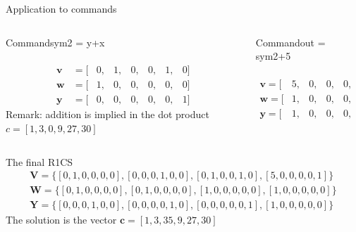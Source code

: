 \documentclass[handout]{beamer}
\begin{document}
\begin{frame}{Application to commands}   
    \begin{columns}[T] %
    \begin{column}{.48\textwidth}
    \begin{block}{Command}sym2 = y+x\end{block}
    
    \begin{align*}       
         [ &one,&x,&out,&sym_1,&y,&sym_2 ]\\ 
         \bm{v} &= [&0,&1,&0,&0,&1,&0]  \\ 
         \bm{w} &= [&1,&0,&0,&0,&0,&0]  \\
         \bm{y} &= [&0,&0,&0,&0,&0,&1] 
    \end{align*}    \pause
    Remark: addition is implied in the dot product
    $c = [1,3,0,9,27,30]$
    \end{column}%
    \hfill%
    \begin{column}{.48\textwidth}
    \begin{block}{Command}out = sym2+5\end{block}
    
    \begin{align*}     
         [ &one,&x,&out,&sym_1,&y,&sym_2 ]\\    
         \bm{v} = [&5,&0,&0,&0,&0,&1]  \\
         \bm{w} = [&1,&0,&0,&0,&0,&0]  \\
         \bm{y} = [&1,&0,&0,&0,&0,&0] 
    \end{align*}    
    \end{column}%
\end{columns} 
\end{frame}

\begin{frame}{The final R1CS}
    \begin{align*}        
         \bm{V} = \{[0,1,0,0,0,0], [0,0,0,1,0,0],[0,1,0,0,1,0],[5,0,0,0,0,1]  \}\\
         \bm{W} = \{[0,1,0,0,0,0],[0,1,0,0,0,0],[1,0,0,0,0,0] ,[1,0,0,0,0,0]  \}\\
         \bm{Y} = \{[0,0,0,1,0,0], [0,0,0,0,1,0], [0,0,0,0,0,1] ,[1,0,0,0,0,0]  \}
    \end{align*}  
    \pause
    The solution is the vector  $\bm{c} = [1,3,35,9,27,30] $
\end{frame}
\end{document}
